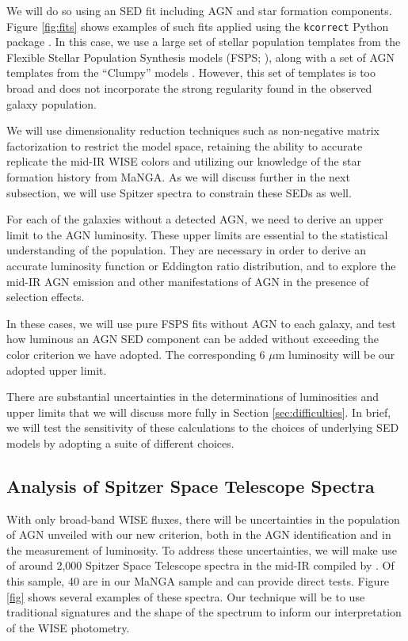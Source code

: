 \documentclass[12pt, preprint]{hacked-aastex}
\begin{document}
We will do so using an SED fit including AGN and star formation components. 
Figure \ref{fig:fits} shows examples of such fits applied using the
{\tt kcorrect} Python package \cite{blanton07a}. In this case, we use  
a large set of stellar population templates from the Flexible Stellar
Population Synthesis models (FSPS; \cite{conroy09a}), along with a set of AGN
templates from the ``Clumpy'' models \cite{nenkova08a}. However, this set
of templates is too broad and does not incorporate the strong regularity 
found in the observed galaxy population. 

We will use dimensionality reduction techniques such as non-negative 
matrix factorization to restrict the model space, retaining the ability
to accurate replicate the mid-IR WISE colors and utilizing our knowledge
of the star formation history from MaNGA.
As we will discuss further in the next subsection, we will use Spitzer spectra 
to constrain these SEDs as well.

For each of the galaxies without a detected AGN, we need to derive an
upper limit to the AGN luminosity. These upper limits are essential to 
the statistical understanding of the population. They are necessary in 
order to derive an accurate luminosity function or Eddington ratio
distribution, and to explore the mid-IR AGN emission and other manifestations 
of AGN in the presence of selection effects.

In these cases, we will use pure FSPS fits without AGN to each galaxy, and
test how luminous an AGN SED component can be added without exceeding the 
color criterion we have adopted. The corresponding 6 $\mu$m luminosity 
will be our adopted upper limit.

There are substantial uncertainties in the determinations of luminosities
and upper limits that we will discuss more fully in  Section 
\ref{sec:difficulties}. In brief, we will test the sensitivity 
of these calculations to the choices of underlying SED models by adopting 
a suite of different choices. 


\subsection{Analysis of Spitzer Space Telescope Spectra}

With only broad-band WISE fluxes, there will be uncertainties in 
the population of AGN unveiled with our new criterion, both in the 
AGN identification and in the measurement of luminosity. To address 
these uncertainties, we will make use of around 2,000 Spitzer Space Telescope
spectra in the mid-IR compiled by \cite{lambrides}. Of this sample, 40 
are in our MaNGA sample and can provide direct tests. 
Figure \ref{fig} shows several examples of these spectra.
Our technique will
be to use traditional signatures and the shape of the spectrum to 
inform our interpretation of the WISE photometry.
\end{document}
